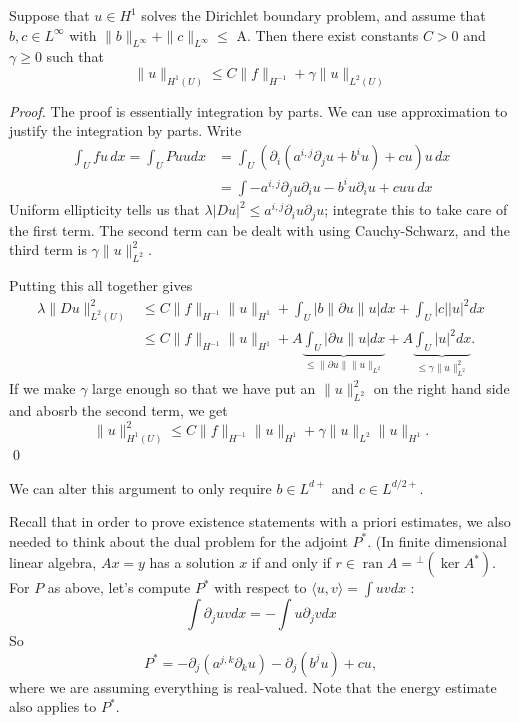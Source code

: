 \begin{theorem}
\label{thm: a-priori estimate}
Suppose that $u \in H^{1}$ solves the Dirichlet boundary problem, and assume that $b, c \in L^{\infty}$ with $\|b\|_{L^{\infty}}+\|c\|_{L^{\infty}} \leq$ A. Then there exist constants $C>0$ and $\gamma \geq 0$ such that
$$
\|u\|_{H^{1}(U)} \leq C\|f\|_{H^{-1}}+\gamma\|u\|_{L^{2}(U)}
$$
\end{theorem}
\begin{proof}
The proof is essentially integration by parts. We can use approximation to justify the integration by parts. Write
\begin{align*}
       \int_{U}fu \, dx = \int_{U} P u ud x 
       &=\int_{U}\left(\partial_{i}\left(a^{i, j} \partial_{j} u+b^{i} u\right)+c u\right) u \,d x \\
        &=\int-a^{i, j} \partial_{j} u \partial_{i} u-b^{i} u \partial_{i} u+c u u \,d x
\end{align*}
Uniform ellipticity tells us that $\lambda|D u|^{2} \leq a^{i, j} \partial_{i} u \partial_{j} u$; integrate this to take care of the first term. The second term can be dealt with using Cauchy-Schwarz, and the third term is $\gamma\|u\|_{L^{2}}^{2} .$

Putting this all together gives
$$
\begin{aligned}
\lambda\|D u\|_{L^{2}(U)}^{2} & \leq C\|f\|_{H^{-1}}\|u\|_{H^{1}}+\int_{U}|b\|\partial u\| u| d x+\int_{U}|c||u|^{2} d x \\
& \leq C\|f\|_{H^{-1}}\|u\|_{H^{1}}+A \underbrace{\int_{U}|\partial u \| u| d x}_{\leq\|\partial u\|\|u\|_{L^{2}}}+A \underbrace{\int_{U}|u|^{2} d x}_{\leq \gamma\|u\|_{L^{2}}^{2}} .
\end{aligned}
$$
If we make $\gamma$ large enough so that we have put an $\|u\|_{L^{2}}^{2}$ on the right hand side and abosrb the second term, we get
$$
\|u\|_{H^{1}(U)}^{2} \leq C\|f\|_{H^{-1}}\|u\|_{H^{1}}+\gamma\|u\|_{L^{2}}\|u\|_{H^{1}} .
$$
\qed 
\end{proof}
\begin{remark}
We can alter this argument to only require $b\in L^{d+}$ and $c\in L^{d/2+}$.
\end{remark}

Recall that in order to prove existence statements with a priori estimates, we also needed to think about the dual problem for the adjoint $P^{*}$. (In finite dimensional linear algebra, $A x=y$ has a solution $x$ if and only if $r \in \operatorname{ran} A={ }^{\perp}\left(\operatorname{ker} A^{*}\right)$. For $P$ as above, let's compute $P^{*}$ with respect to $\langle u, v\rangle=\int u v d x$ :
$$
\int \partial_{j} u v d x=-\int u \partial_{j} v d x
$$
So
$$
P^{*}=-\partial_{j}\left(a^{j, k} \partial_{k} u\right)-\partial_{j}\left(b^{j} u\right)+c u,
$$
where we are assuming everything is real-valued. Note that the energy estimate also applies to $P^{*}$.

